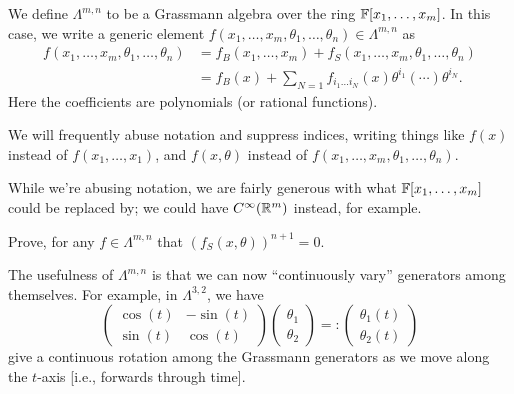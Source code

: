 \begin{definition}
We define $\Lambda^{m,n}$ to be a Grassmann algebra over the ring
$\mathbb{F}[x_{1},\dots,x_{m}]$. In this case, we write a generic element
$f(x_{1},\dots,x_{m},\theta_{1},\dots,\theta_{n})\in\Lambda^{m,n}$ as
\begin{equation}
  \begin{split}
  f(x_{1},\dots,x_{m},\theta_{1},\dots,\theta_{n})
&= f_{B}(x_{1},\dots,x_{m}) + f_{S}(x_{1},\dots,x_{m},\theta_{1},\dots,\theta_{n})\\
&= f_{B}(x) + \sum_{N=1}f_{i_{1}\dots i_{N}}(x)\theta^{i_{1}}(\cdots)\theta^{i_{N}}.
  \end{split}
\end{equation}
Here the coefficients are polynomials (or rational functions).
\end{definition}

\begin{remark}
We will frequently abuse notation and suppress indices, writing things
like $f(x)$ instead of $f(x_{1},\dots,x_{1})$, and $f(x,\theta)$ instead
of $f(x_{1},\dots,x_{m},\theta_{1},\dots,\theta_{n})$.

While we're abusing notation, we are fairly generous with what
$\mathbb{F}[x_{1},\dots,x_{m}]$ could be replaced by; we could have
$C^{\infty}(\mathbb{R}^{m})$ instead, for example.
\end{remark}

\begin{exercise}
Prove, for any $f\in\Lambda^{m,n}$ that $(f_{S}(x,\theta))^{n+1}=0$.
\end{exercise}

\M
The usefulness of $\Lambda^{m,n}$ is that we can now ``continuously
vary'' generators among themselves. For example, in $\Lambda^{3,2}$, we
have
\begin{equation}
  \begin{pmatrix}
    \cos(t) & -\sin(t)\\
    \sin(t) &  \cos(t)
  \end{pmatrix}\begin{pmatrix}\theta_{1}\\\theta_{2}
  \end{pmatrix} =: \begin{pmatrix}\theta_{1}(t)\\\theta_{2}(t)
  \end{pmatrix}
\end{equation}
give a continuous rotation among the Grassmann generators as we move
along the $t$-axis [i.e., forwards through time].


